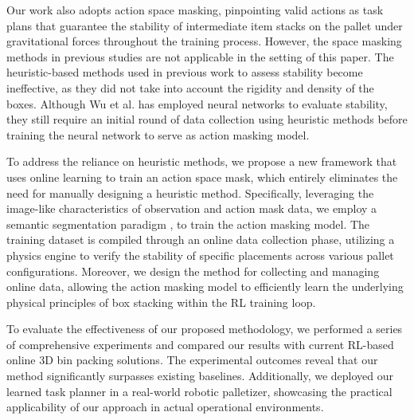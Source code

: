 Our work also adopts action space masking, pinpointing valid actions as task plans that guarantee the stability of intermediate item stacks on the pallet under gravitational forces throughout the training process.
However, the space masking methods in previous studies are not applicable in the setting of this paper.
The heuristic-based methods \cite{zhao2022learning} \cite{faroe2003guided} used in previous work to assess stability become ineffective, as they did not take into account the rigidity and density of the boxes.
Although Wu et al. \cite{wu2024efficient} has employed neural networks to evaluate stability, they still require an initial round of data collection using heuristic methods before training the neural network to serve as action masking model.

To address the reliance on heuristic methods, we propose a new framework that uses online learning to train an action space mask, which entirely eliminates the need for manually designing a heuristic method. Specifically, leveraging the image-like characteristics of observation and action mask data, we employ a semantic segmentation paradigm \cite{chen2014semantic}, \cite{long2015fully} to train the action masking model. The training dataset is compiled through an online data collection phase, utilizing a physics engine to verify the stability of specific placements across various pallet configurations. Moreover, we design the method for collecting and managing online data, allowing the action masking model to efficiently learn the underlying physical principles of box stacking within the RL training loop.

To evaluate the effectiveness of our proposed methodology, we performed a series of comprehensive experiments and compared our results with current RL-based online 3D bin packing solutions. The experimental outcomes reveal that our method significantly surpasses existing baselines. Additionally, we deployed our learned task planner in a real-world robotic palletizer, showcasing the practical applicability of our approach in actual operational environments.